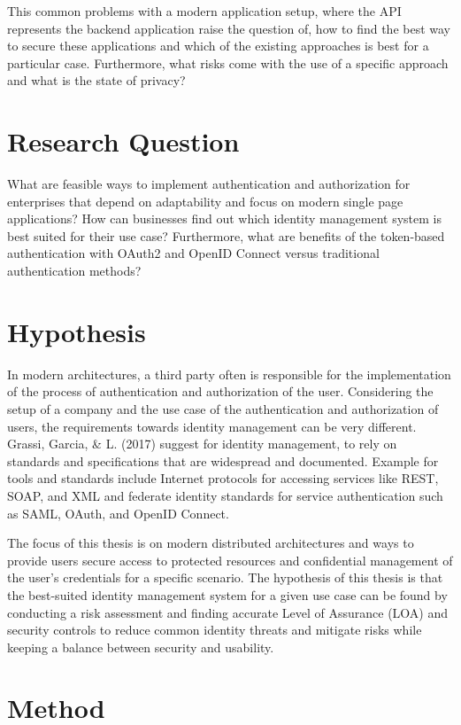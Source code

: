 This common problems with a modern application setup, where the API represents the backend application raise the question of, how to find the best way to secure these applications and which of the existing approaches is best for a particular case. Furthermore, what risks come with the use of a specific approach and what is the state of privacy? 


\section{Research Question}

What are feasible ways to implement authentication and authorization for enterprises that depend on adaptability and focus on modern single page applications? How can businesses find out which identity management system is best suited for their use case? Furthermore, what are benefits of the token-based authentication with OAuth2 and OpenID Connect versus traditional authentication methods? 

\section{Hypothesis}

In modern architectures, a third party often is responsible for the implementation of the process of authentication and authorization of the user. Considering the setup of a company and the use case of the authentication and authorization of users, the requirements towards identity management can be very different. Grassi, Garcia, \& L. (2017) suggest for identity management, to rely on standards and specifications that are widespread and documented. Example for tools and standards include Internet protocols for accessing services like REST, SOAP, and XML and federate identity standards for service authentication such as SAML, OAuth, and OpenID Connect.

The focus of this thesis is on modern distributed architectures and ways to provide users secure access to protected resources and confidential management of the user’s credentials for a specific scenario. The hypothesis of this thesis is that the best-suited identity management system for a given use case can be found by conducting a risk assessment and finding accurate Level of Assurance (LOA) and security controls to reduce common identity threats and mitigate risks while keeping a balance between security and usability.

\section{Method}

